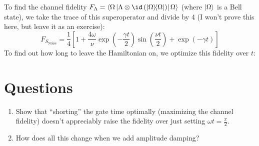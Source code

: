 \documentclass[10pt,a4paper, english]{scrartcl}
\begin{document}
To find the channel fidelity $F_{\Lambda} = \elem{\Omega}{\Lambda \otimes \id \left( \proj{\Omega} \right)}{\Omega}$ (where ${\left\vert{\Omega}\right\rangle}$ is a Bell state), we take the trace of this superoperator and divide by 4 (I won't prove this here, but leave it as an exercise):
\begin{equation}
F_{S_{\textrm{Noise}}} = \frac{1}{4} \left[ 1 + \frac{4\omega}{\nu} \exp\left(-\frac{\gamma t}{2}\right) \sin\left(\frac{\nu t}{2}\right) + \exp\left(-\gamma t\right) \right]
\end{equation}
To find out how long to leave the Hamiltonian on, we optimize this fidelity over $t$:
\section{Questions}
\begin{enumerate}
\item Show that ``shorting'' the gate time optimally (maximizing the channel fidelity) doesn't appreciably raise the fidelity over just setting $\omega t = \frac{\pi}{2}$.
\item How does all this change when we add amplitude damping? 
\end{enumerate}
\end{document}

